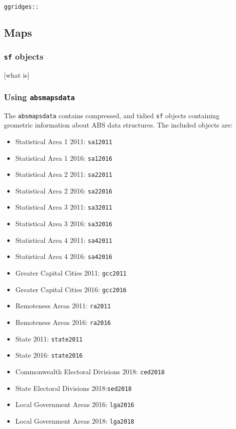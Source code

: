 \documentclass[]{book}
\providecommand{\tightlist}{%
  \setlength{\itemsep}{0pt}\setlength{\parskip}{0pt}}
\begin{document}
\texttt{ggridges::}

\hypertarget{maps}{%
\subsection{Maps}\label{maps}}

\hypertarget{sf-objects}{%
\subsubsection{\texorpdfstring{\texttt{sf} objects}{sf objects}}\label{sf-objects}}

{[}what is{]}

\hypertarget{using-absmapsdata}{%
\subsubsection{\texorpdfstring{Using \texttt{absmapsdata}}{Using absmapsdata}}\label{using-absmapsdata}}

The \texttt{absmapsdata} contains compressed, and tidied \texttt{sf} objects containing geometric information about ABS data structures. The included objects are:

\begin{itemize}
\tightlist
\item
  Statistical Area 1 2011: \texttt{sa12011}
\item
  Statistical Area 1 2016: \texttt{sa12016}
\item
  Statistical Area 2 2011: \texttt{sa22011}
\item
  Statistical Area 2 2016: \texttt{sa22016}
\item
  Statistical Area 3 2011: \texttt{sa32011}
\item
  Statistical Area 3 2016: \texttt{sa32016}
\item
  Statistical Area 4 2011: \texttt{sa42011}
\item
  Statistical Area 4 2016: \texttt{sa42016}
\item
  Greater Capital Cities 2011: \texttt{gcc2011}
\item
  Greater Capital Cities 2016: \texttt{gcc2016}
\item
  Remoteness Areas 2011: \texttt{ra2011}
\item
  Remoteness Areas 2016: \texttt{ra2016}
\item
  State 2011: \texttt{state2011}
\item
  State 2016: \texttt{state2016}
\item
  Commonwealth Electoral Divisions 2018: \texttt{ced2018}
\item
  State Electoral Divisions 2018:\texttt{sed2018}
\item
  Local Government Areas 2016: \texttt{lga2016}
\item
  Local Government Areas 2018: \texttt{lga2018}
\end{itemize}
\end{document}
